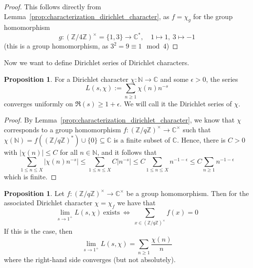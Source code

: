 \documentclass{scrartcl}
\newcommand{\N}{\mathbb{N}}
\newcommand{\Z}{\mathbb{Z}}
\newcommand{\C}{\mathbb{C}}
\newcommand{\units}{\times}
\theoremstyle{definition}
\newtheorem{proposition}[definition]{Proposition}
\begin{document}
\begin{proof}
    This follows directly from Lemma~\ref{prop:characterization_dirichlet_character}, as $f = \chi_g$ for the group homomorphism
    \begin{equation*}
        g: (\Z/4\Z)^\units = \{ 1, 3 \} \to \C^*, \quad 1 \mapsto 1, \ 3 \mapsto -1
    \end{equation*}
    (this is a group homomorphism, as $3^2 = 9 \equiv 1 \mod 4$)
\end{proof}
Now we want to define Dirichlet series of Dirichlet characters.
\begin{proposition}
    For a Dirichlet character $\chi: \N \to \C$ and some $\epsilon > 0$, the series
    \begin{equation*}
        L(s, \chi) := \sum_{n \geq 1} \chi(n) n^{-s}
    \end{equation*}
    converges uniformly on $\Re(s) \geq 1 + \epsilon$.
    We will call it the Dirichlet series of $\chi$.
\end{proposition}
\begin{proof}
    By Lemma~\ref{prop:characterization_dirichlet_character}, we know that $\chi$ corresponds to a group homomorphism $f: (\Z/q\Z)^\units \to \C^\units$ such that $\chi(\N) = f((\Z/q\Z)^*) \cup \{ 0 \} \subseteq \C$ is a finite subset of $\C$.
    Hence, there is $C > 0$ with $|\chi(n)| \leq C$ for all $n \in \N$, and it follows that
    \begin{equation*}
        \sum_{1 \leq n \leq X} \left| \chi(n) n^{-s} \right| \leq \sum_{1 \leq n \leq X} C \left| n^{-s} \right| \leq C \sum_{1 \leq n \leq X} n^{-1 - \epsilon} \leq C \sum_{n \geq 1} n^{-1 - \epsilon}
    \end{equation*}
    which is finite.
\end{proof}
\begin{proposition}
    \label{prop:dirichlet_series_at_one}
    Let $f: (\Z/q\Z)^\units \to \C^\units$ be a group homomorphism. Then for the associated Dirichlet character $\chi = \chi_f$ we have that
    \begin{equation*}
        \lim_{s \to 1^+} L(s, \chi) \ \text{exists} \ \Leftrightarrow \ \sum_{x \in (\Z/q\Z)^\units} f(x) = 0
    \end{equation*}
    If this is the case, then
    \begin{equation*}
        \lim_{s \to 1^+} L(s, \chi) = \sum_{n \geq 1} \frac {\chi(n)} n
    \end{equation*}
    where the right-hand side converges (but not absolutely).
\end{proposition}
\end{document}
